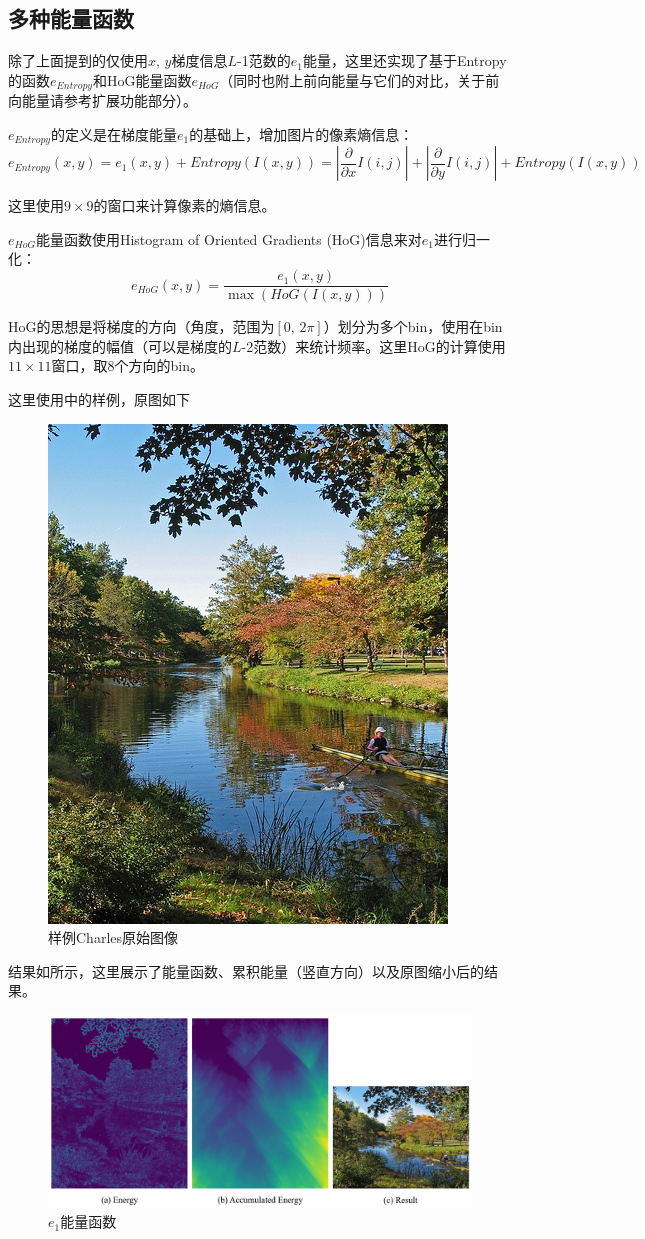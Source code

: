\documentclass[twoside,a4paper,4pt]{article}
\begin{document}
\subsection{多种能量函数}
除了上面提到的仅使用$x,\,y$梯度信息$L$-1范数的$e_1$能量，这里还实现了基于Entropy的函数$e_{Entropy}$和HoG能量函数$e_{HoG}$（同时也附上前向能量与它们的对比，关于前向能量请参考扩展功能部分）。\par
$e_{Entropy}$的定义是在梯度能量$e_1$的基础上，增加图片的像素熵信息：
$$
 e_{Entropy}(x,y) = e_1(x,y) + Entropy(I(x, y)) = \left|\frac{\partial}{\partial x} I(i, j)\right| + \left|\frac{\partial}{\partial y} I(i, j)\right| + Entropy(I(x,y))
$$\par
这里使用$9\times9$的窗口来计算像素的熵信息。\par
$e_{HoG}$能量函数使用Histogram of Oriented Gradients (HoG)信息来对$e_1$进行归一化：
$$
 e_{HoG}(x, y) = \frac{e_1(x,y)}{\max{(HoG(I(x,y)))}}
$$\par
HoG的思想是将梯度的方向（角度，范围为$[0,\,2\pi]$）划分为多个bin，使用在bin内出现的梯度的幅值（可以是梯度的$L$-2范数）来统计频率。这里HoG的计算使用$11\times 11$窗口，取$8$个方向的bin。\par
这里使用\cite{avidan2007seam}中的样例，原图如下
\begin{figure}[H]
    \centering
    \includegraphics[width=0.4\linewidth]{demo/orig/charles.jpg}
    \caption{样例Charles原始图像}
    \label{fig:multi_energy_func_orig}
\end{figure}\par

结果如所示，这里展示了能量函数、累积能量（竖直方向）以及原图缩小后的结果。
\begin{figure}[H]
    \centering
    \includegraphics[width=\linewidth]{demo/output/charles_gradient.png}
    \vspace{-30pt}\caption{$e_1$能量函数}
    \label{fig:charles_e1}
\end{figure}\par
\end{document}
